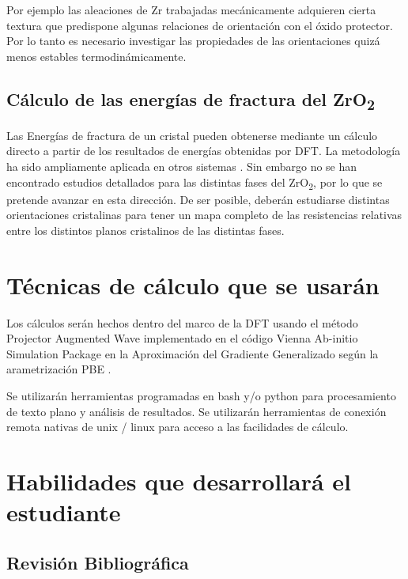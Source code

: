 Por ejemplo las aleaciones de Zr trabajadas mecánicamente adquieren
cierta textura \cite{Malamud2018,Gloaguen2010} que predispone algunas relaciones de orientación 
con el óxido protector. Por lo tanto es necesario investigar las propiedades de las orientaciones
quizá menos estables termodinámicamente. 

\subsection{Cálculo de las energías de fractura del ZrO\textsubscript{2}}

Las Energías de fractura de un cristal pueden obtenerse mediante un cálculo directo 
a partir de los resultados de energías obtenidas por DFT. La metodología ha sido 
ampliamente aplicada en otros sistemas \cite{Liao2010, Liao2010a, Forti2016}. Sin embargo 
no se han encontrado estudios detallados para las distintas fases del ZrO\textsubscript{2}, 
por lo que se pretende avanzar en esta dirección. De ser posible, deberán estudiarse distintas
orientaciones cristalinas para tener un mapa completo de las resistencias relativas entre
los distintos planos cristalinos de las distintas fases. 

\section{Técnicas de cálculo que se usarán}

Los cálculos serán hechos dentro del marco de la DFT \cite{KohnSham65,
HohenbergKohn64} usando el método 
Projector Augmented Wave\cite{Bloch1994,Kresse1999}
implementado en el código Vienna Ab-initio 
Simulation Package\cite{Hafner2007,Hafner2008}
en la Aproximación del Gradiente Generalizado según la 
arametrización PBE \cite{PBE}. 

Se utilizarán herramientas programadas en bash y/o python para procesamiento de 
texto plano y análisis de resultados. Se utilizarán herramientas de conexión 
remota nativas de unix / linux para acceso a las facilidades de cálculo.

\section{Habilidades que desarrollará el estudiante}

\subsection{ Revisión Bibliográfica}

